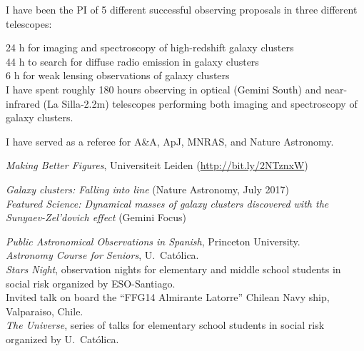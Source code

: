 \documentclass[11pt]{article}
\begin{document}

\noindent
I have been the PI of 5 different successful observing proposals in three different telescopes:

\noindent
 24 h for imaging and spectroscopy of high-redshift galaxy clusters\\
 44 h to search for diffuse radio 
emission in galaxy clusters\\
 6 h for weak lensing observations of galaxy clusters\\


{I have spent roughly 180 hours observing in 
optical (Gemini South) and near-infrared (La Silla-2.2m) telescopes performing both 
imaging and spectroscopy of galaxy clusters.}


%


\noindent
I have served as a referee for A\&A, ApJ, MNRAS, and Nature Astronomy.


\noindent
{} \emph{Making Better Figures}, Universiteit Leiden (\url{http://bit.ly/2NTznxW})


\noindent
{} \emph{Galaxy clusters: Falling into line} (Nature Astronomy, July 2017)\\
 \emph{Featured Science: Dynamical masses of galaxy clusters discovered with the Sunyaev-Zel'dovich effect} (Gemini Focus)


\noindent
{} \emph{Public Astronomical Observations in Spanish}, Princeton University.\\
 \emph{Astronomy Course for Seniors}, U.\ Cat\'olica.\\
 \emph{Stars Night}, observation nights for elementary and middle school students in social risk organized by ESO-Santiago.\\
 Invited talk on board the ``FFG14 Almirante Latorre'' Chilean Navy ship, Valparaiso, Chile.\\
 \emph{The Universe}, series of talks for elementary school students in social risk organized by U.\ Cat\'olica.\\
\end{document}
